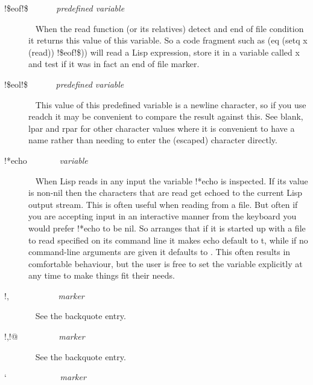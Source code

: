 \begin{description}
\item[{\tx !\$eof!\$~~~~~~} \hspace{1cm} {\em predefined variable}]~\newline
When the {\tx read} function (or its relatives) detect and end of file
condition it returns this value of this variable. So a code fragment such as
{\tx (eq (setq x (read)) !\$eof!\$))} will read a Lisp expression,
store it in a variable called {\tx x} and test if it was in fact
an end of file marker.
\item[{\tx !\$eol!\$~~~~~~} \hspace{1cm} {\em predefined variable}]~\newline
This value of this predefined variable is a newline character, so if you
use {\tx readch} it may be convenient to compare the result against this.
See {\tx blank}, {\tx lpar} and {\tx rpar} for other character values where
it is convenient to have a name rather than needing to enter the (escaped)
character directly.
\item[{\tx !*echo~~~~~~~} \hspace{1cm} {\em variable}]~\newline
When Lisp reads in any input the variable {\tx !*echo} is inspected. If
its value is non-nil then the characters that are read get echoed to the
current Lisp output stream. This is often useful when reading from a file. But
often if you are accepting input in an interactive manner from the keyboard
you would prefer {\tx !*echo} to be {\tx nil}. So \vsl{} arranges that if
it is started up with a file to read specified on its command line it
makes {\tx echo} default to {\tx t}, while if no command-line arguments are
given it defaults to \nil. This often results in comfortable behaviour, but
the user is free to set the variable explicitly at any time to make things
fit their needs.
\item[{\tx !,~~~~~~~~~~~} \hspace{1cm} {\em marker}]~\newline
See the backquote entry.
\item[{\tx !,!@~~~~~~~~~} \hspace{1cm} {\em marker}]~\newline
See the backquote entry.
\item[{\tx `~~~~~~~~~~~~} \hspace{1cm} {\em marker}]~\newline

\end{description}
